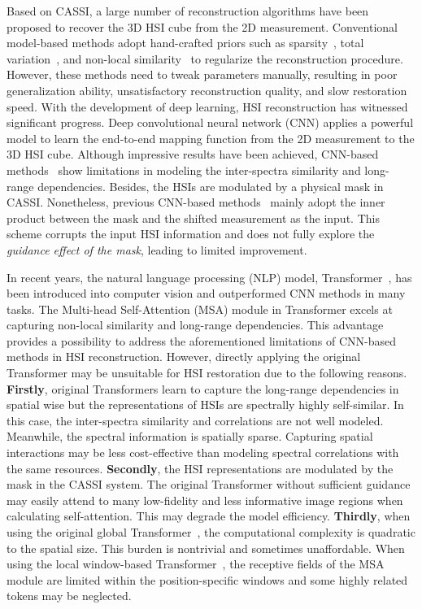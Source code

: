 \documentclass[10pt,twocolumn,letterpaper]{article}
\begin{document}
Based on CASSI, a large number of reconstruction algorithms have been proposed to recover the 3D HSI cube from the 2D measurement. Conventional model-based methods adopt hand-crafted priors such as sparsity~\cite{sparse_1,sparse_2,sparse_3}, total variation~\cite{tv_1,tv_2,gap_tv}, and non-local similarity~\cite{desci,non_local_1,non_local_2} to regularize the reconstruction procedure. However, these methods need to tweak parameters manually, resulting in poor generalization ability, unsatisfactory reconstruction quality, and slow restoration speed. With the development of deep learning, HSI reconstruction has witnessed significant progress. Deep convolutional neural network (CNN) applies a powerful model to learn the end-to-end mapping function from the 2D measurement to the 3D HSI cube. Although impressive results have been achieved, CNN-based methods~\cite{lambda,tsa_net,gsm,gapnet} show limitations in modeling the inter-spectra similarity and long-range dependencies. Besides, the HSIs are modulated by a physical mask in CASSI. Nonetheless, previous CNN-based  methods~\cite{tsa_net,resu,gapnet,self} mainly adopt the inner product between the mask and the shifted measurement as the input. This scheme corrupts the input HSI information and does not fully explore the {\em guidance effect of the mask}, leading to limited improvement.

In recent years, the natural language processing (NLP) model, Transformer~\cite{vaswani2017attention}, has been introduced into computer vision and outperformed CNN methods in many tasks. The Multi-head Self-Attention (MSA) module in Transformer excels at capturing non-local similarity and long-range dependencies. This advantage  provides a possibility to address the aforementioned limitations of CNN-based methods in HSI reconstruction. However, directly applying the original Transformer may be unsuitable for HSI restoration due to the following reasons. \textbf{Firstly}, original Transformers learn to capture the long-range dependencies in spatial wise but the representations of HSIs are spectrally highly self-similar. In this case, the inter-spectra similarity and correlations are not well modeled. Meanwhile, the spectral information is spatially sparse. Capturing spatial interactions may be less cost-effective than modeling spectral correlations with the same resources.  \textbf{Secondly}, the HSI representations are modulated by the  mask in the CASSI system. The original Transformer without sufficient guidance may easily attend to many low-fidelity and less informative  image  regions when calculating self-attention. This may degrade the model efficiency. \textbf{Thirdly}, when using the original global Transformer~\cite{global_msa}, the computational complexity is quadratic to the spatial size. This burden is nontrivial and sometimes unaffordable. When using the local window-based Transformer~\cite{liu2021swin}, the receptive fields of the MSA module are limited within the position-specific windows and some highly related tokens may be neglected.
\end{document}
